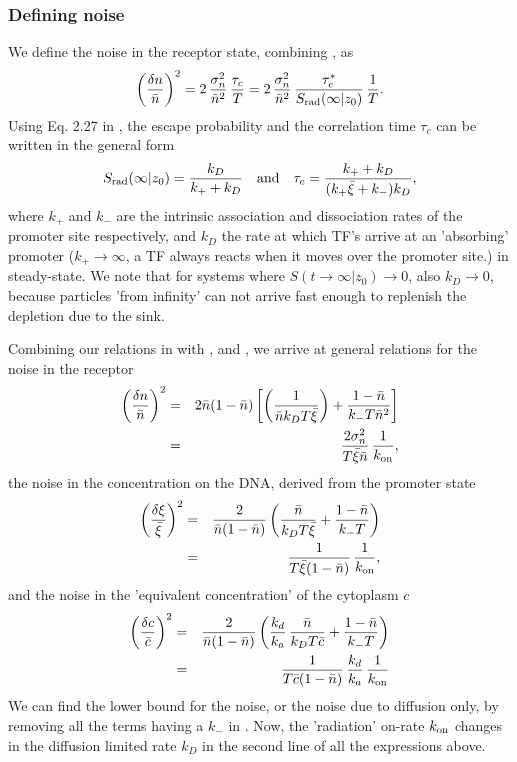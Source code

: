 \subsubsection{Defining noise}
We define the noise in the receptor state, combining , as
\begin{equation}
 \left( \frac{\delta n}{\bar{n}} \right)^2 = 2 \, \frac{\sigma_n^2}{\bar{n}^2} \, \frac{\tau_c}{T} = 2 \, \frac{\sigma_n^2}{\bar{n}^2} \, \frac{\tau_c^*}{S_{\rm rad}(\infty|z_0)} \, \frac{1}{T}.
 \elabel{EqProNoise}
\end{equation}
Using Eq. 2.27 in \cite{Agmon1990}, the escape probability and the correlation time $\tau_c$ can be written in the general form
\begin{equation}
 S_{\rm rad}(\infty|z_0) = \frac{k_D}{k_+ + k_D} \quad {\rm and} \quad \tau_c = \frac{k_+ + k_D}{(k_+ \bar{\xi} + k_-) k_D},
 \elabel{Sinfty}
\end{equation}
where $k_+$ and $k_-$ are the intrinsic association and dissociation rates of the promoter site respectively, and $k_D$ the rate at which TF's arrive at an 'absorbing' promoter ($k_+ \to \infty$, a TF always reacts when it moves over the promoter site.) in steady-state. We note that for systems where $S(t\to\infty|z_0)\to0$, also $k_D\to0$, because particles 'from infinity' can not arrive fast enough to replenish the depletion due to the sink. 

Combining our relations in  with ,  and , we arrive at general relations for the noise in the receptor
\begin{eqnarray}
 \elabel{NoisePro}
 \left( \frac{\delta n}{\bar{n}} \right)^2 & = & 2 \bar{n}(1-\bar{n})\left[\left( \frac{1}{\bar{n} k_D T \bar{\xi}} \right)+\frac{1-\bar{n}}{k_- T \bar{n}^2} \right] \\
 & = & \frac{2 \sigma_n^2}{T \bar{\xi} \bar{n}} \, \frac{1}{k_{\rm on}},
\end{eqnarray}
the noise in the concentration on the DNA, derived from the promoter state
\begin{eqnarray}
 \elabel{NoiseXi}
 \left( \frac{\delta \xi}{\bar{\xi}} \right)^2 & = & \frac{2}{\bar{n}(1-\bar{n})} \left( \frac{\bar{n}}{k_D T \bar{\xi}} + \frac{1-\bar{n}}{k_- T}  \right) \\
  & = & \frac{1}{T \bar{\xi} (1 - \bar{n})} \, \frac{1}{k_{\rm on}},
\end{eqnarray}
and the noise in the 'equivalent concentration' of the cytoplasm $c$
\begin{eqnarray}
 \elabel{NoiseC} 
 \left( \frac{\delta c}{\bar{c}} \right)^2 & = & \frac{2}{\bar{n}(1-\bar{n})} \left( \frac{k_d}{k_a} \, \frac{\bar{n}}{k_D T \bar{c}} + \frac{1-\bar{n}}{k_- T}  \right) \\ \elabel{NoiseC2} 
 & = & \frac{1}{T \bar{c} (1 - \bar{n})} \, \frac{k_d}{k_a} \, \frac{1}{k_{\rm on}}
\end{eqnarray}
We can find the lower bound for the noise, or the noise due to diffusion only, by removing all the terms having a $k_-$ in . Now, the 'radiation' on-rate $k_{\rm on}$ changes in the diffusion limited rate $k_D$ in the second line of all the expressions above. 

